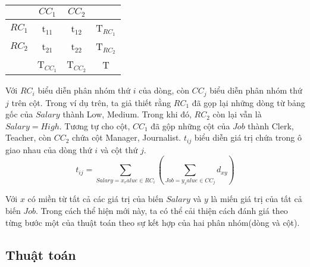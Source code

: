 \begin{table}[ht]
\begin{center}
\begin{tabular}{|c|c|c|c|}
\hline
& $CC_1$ & $CC_2$ & \\
\hline
$RC_1$ & t$_{11}$ & t$_{12}$ & T$_{RC_1}$ \\
\hline
$RC_2$ & t$_{21}$ & t$_{22}$ & T$_{RC_2}$ \\
\hline
& T$_{CC_1}$ & T$_{CC_2}$ & T \\
\hline
\end{tabular}
\end{center}
\end{table}

Với $RC_i$ biểu diễn phân nhóm thứ $i$ của dòng, còn $CC_j$ biểu diễn phân nhóm thứ $j$ trên cột. Trong ví dụ trên, ta giả thiết rằng $RC_1$ đã gọp lại những dòng từ bảng gốc của $Salary$ thành {Low, Medium}. Trong khi đó, $RC_2$ còn lại vẫn là $Salary=High$. Tương tự cho cột, $CC_1$ đã gộp những cột của $Job$ thành {Clerk, Teacher}, còn $CC_2$ chứa cột {Manager, Journalist}. $t_{ij}$ biểu diễn giá trị chứa trong ô giao nhau của dòng thứ $i$ và cột thứ $j$. 
\begin{equation}
t_{ij} = \sum_{Salary=x_value \in RC_i} (\sum_{Job=y_value \in CC_j} d_{xy})
\end{equation}

\hspace{10mm}Với $x$ có miền từ tất cả các giá trị của biến $Salary$ và $y$ là miến giá trị của tất cả biến $Job$. Trong cách thể hiện mới này, ta có thể cải thiện cách đánh giá theo từng bước một của thuật toán theo sự kết hợp của hai phân nhóm(dòng và cột). 

\subsection{Thuật toán}



